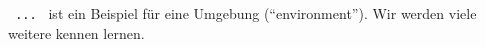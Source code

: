 

  \lstinline! ... ! ist ein Beispiel für eine Umgebung (\enquote{environment}). Wir werden viele weitere kennen lernen.













